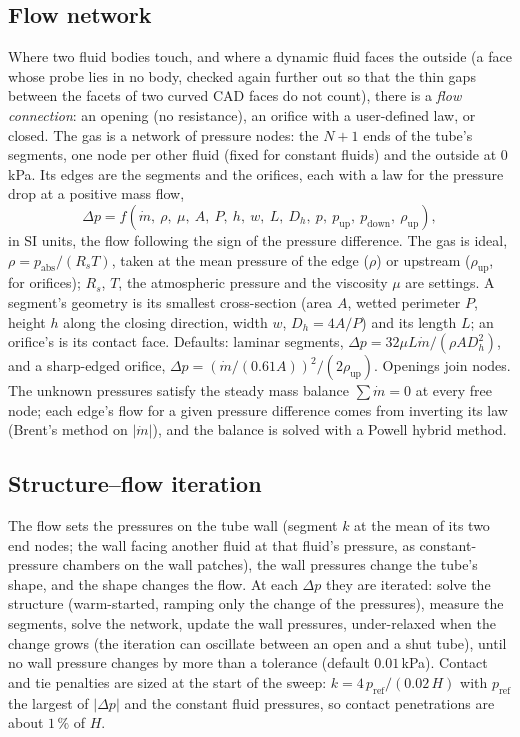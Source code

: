 \documentclass[11pt,a4paper]{article}
\theoremstyle{remark}
\begin{document}
\subsection{Flow network}
Where two fluid bodies touch, and where a dynamic fluid faces the outside (a face whose probe lies in
no body, checked again further out so that the thin gaps between the facets of two curved CAD faces do
not count), there is a \emph{flow connection}: an opening (no resistance), an orifice with a
user-defined law, or closed. The gas is a network of pressure nodes: the $N+1$ ends of the tube's
segments, one node per other fluid (fixed for constant fluids) and the outside at 0\,kPa. Its edges
are the segments and the orifices, each with a law for the pressure drop at a positive mass flow,
\begin{equation}
  \Delta p = f(\dot m,\ \rho,\ \mu,\ A,\ P,\ h,\ w,\ L,\ D_h,\ p,\ p_\mathrm{up},\ p_\mathrm{down},\
  \rho_\mathrm{up}),
\end{equation}
in SI units, the flow following the sign of the pressure difference. The gas is ideal,
$\rho = p_\mathrm{abs}/(R_s T)$, taken at the mean pressure of the edge ($\rho$) or upstream
($\rho_\mathrm{up}$, for orifices); $R_s$, $T$, the atmospheric pressure and the viscosity $\mu$ are
settings. A segment's geometry is its smallest cross-section (area $A$, wetted perimeter $P$, height
$h$ along the closing direction, width $w$, $D_h = 4A/P$) and its length $L$; an orifice's is its
contact face. Defaults: laminar segments, $\Delta p = 32\mu L\dot m/(\rho A D_h^2)$, and a sharp-edged
orifice, $\Delta p = (\dot m/(0.61 A))^2/(2\rho_\mathrm{up})$. Openings join nodes. The unknown pressures
satisfy the steady mass balance $\sum \dot m = 0$ at every free node; each edge's flow for a given
pressure difference comes from inverting its law (Brent's method on $|\dot m|$), and the balance is
solved with a Powell hybrid method.

\subsection{Structure--flow iteration}
The flow sets the pressures on the tube wall (segment $k$ at the mean of its two end nodes; the wall
facing another fluid at that fluid's pressure, as constant-pressure chambers on the wall patches), the
wall pressures change the tube's shape, and the shape changes the flow. At each $\Delta p$ they are
iterated: solve the structure (warm-started, ramping only the change of the pressures), measure the
segments, solve the network, update the wall pressures, under-relaxed when the change grows (the
iteration can oscillate between an open and a shut tube), until no wall pressure changes by more
than a tolerance (default $0.01$\,kPa). Contact and tie penalties are sized at the start of the sweep:
$k = 4\,p_\mathrm{ref}/(0.02\,H)$ with $p_\mathrm{ref}$ the largest of $|\Delta p|$ and the constant
fluid pressures, so contact penetrations are about $1\,\%$ of $H$.
\end{document}
